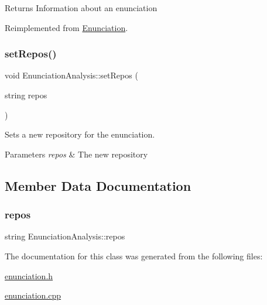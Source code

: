 \begin{DoxyReturn}{Returns}
Information about an enunciation 
\end{DoxyReturn}


Reimplemented from \hyperlink{class_enunciation_a032b5ff494595ab52d152d605544525c}{Enunciation}.

\mbox{\label{class_enunciation_analysis_a5529f1e325fab32099b8845a2b624fa7}} 
\subsubsection{\texorpdfstring{set\+Repos()}{setRepos()}}
{\footnotesize\ttfamily void Enunciation\+Analysis\+::set\+Repos (\begin{DoxyParamCaption}\item[{string}]{repos }\end{DoxyParamCaption})}



Sets a new repository for the enunciation. 


\begin{DoxyParams}{Parameters}
{\em repos} & The new repository \\
\hline
\end{DoxyParams}


\subsection{Member Data Documentation}
\mbox{\label{class_enunciation_analysis_a3ceb48cf1cfe6594b853b52c9ce9aae4}} 
\subsubsection{\texorpdfstring{repos}{repos}}
{\footnotesize\ttfamily string Enunciation\+Analysis\+::repos\hspace{0.3cm}{\ttfamily [protected]}}



The documentation for this class was generated from the following files\+:\begin{DoxyCompactItemize}
\item 
\hyperlink{enunciation_8h}{enunciation.\+h}\item 
\hyperlink{enunciation_8cpp}{enunciation.\+cpp}\end{DoxyCompactItemize}
